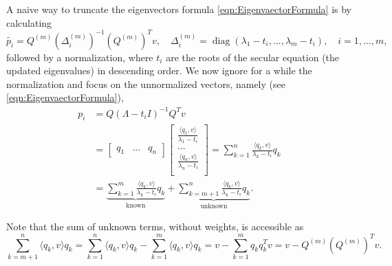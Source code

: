 \documentclass[11pt]{article}
\DeclareMathOperator{\diag}{diag}
\begin{document}
A naive way to truncate the eigenvectors formula \eqref{eqn:EigenvaectorFormula} is by calculating
\begin{equation} \label{eq:naive_TEF}
\widetilde{p_i} = Q^{(m)}(\Delta_i^{(m)})^{-1}(Q^{(m)})^Tv , \quad  \Delta_i^{(m)} = \diag\left(\lambda_1 - t_i,\ldots,\lambda_m - t_i\right), \quad  i=1,\ldots,m ,
\end{equation}
followed by a normalization, where $t_i$ are the roots of the secular equation (the updated eigenvalues) in descending order. We now ignore for a while the normalization and focus on the unnormalized vectors, namely (see \eqref{eqn:EigenvaectorFormula}),
\begin{equation} \label{eqn:simplify_eigenvector_formula}
\begin{split}
{p_i} & = Q(\Lambda - t_i I)^{-1}Q^Tv \\
  & = \begin{bmatrix}
        q_1 & ... & q_n
     \end{bmatrix}
    \begin{bmatrix}
        \frac{\langle q_1, v \rangle}{\lambda_1 - t_i} \\
        ... \\
        \frac{\langle q_n, v \rangle}{\lambda_n - t_i} \\
    \end{bmatrix} = \sum_{k=1}^{n} \frac{\langle q_k, v \rangle}{\lambda_k - t_i}q_k  \\
    & = \underbrace{ \sum_{k=1}^{m} \frac{\langle q_k, v \rangle}{\lambda_k - t_i}q_k}_{\text{known}} + \underbrace{ \sum_{k=m+1}^{n} \frac{\langle q_k, v \rangle}{\lambda_k - t_i}q_k}_{\text{unknown}} .
\end{split}
\end{equation}

Note that the sum of unknown terms, without weights, is accessible as
\begin{equation} \label{eqn:sum_unknown_proj}
\sum_{k=m+1}^{n} \langle q_k, v \rangle q_k = \sum_{k=1}^{n} \langle q_k, v \rangle q_k - \sum_{k=1}^{m} \langle q_k, v \rangle q_k  = v - \sum_{k=1}^{m}q_kq^T_kv = v - Q^{(m)} (Q^{(m)})^Tv .
\end{equation}
\end{document}
